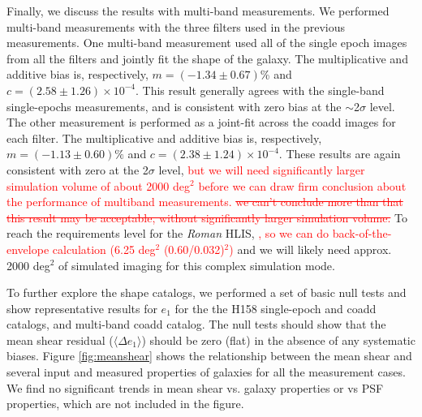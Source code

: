 \documentclass[fleqn,usenatbib]{mnras}
\begin{document}
Finally, we discuss the results with multi-band measurements. We performed multi-band measurements with the three filters used in the previous measurements. One multi-band measurement used all of the single epoch images from all the filters and jointly fit the shape of the galaxy. The multiplicative and additive bias is, respectively, $m=(-1.34\pm0.67)$\% and $c=(2.58\pm1.26)\times10^{-4}$. This result generally agrees with the single-band single-epochs measurements, and is consistent with zero bias at the $\sim$2$\sigma$ level. The other measurement is performed as a joint-fit across the coadd images for each filter. The multiplicative and additive bias is, respectively, $m=(-1.13\pm0.60)\%$ and $c=(2.38\pm1.24)\times10^{-4}$. These results are again consistent with zero at the 2$\sigma$ level, \textcolor{red}{but we will need significantly larger simulation volume of about 2000 \textrm{deg}$^2$ before we can draw firm conclusion about the performance of multiband measurements.} \textcolor{red}{\sout{we can't conclude more than that this result may be acceptable, without significantly larger simulation volume.}} To reach the requirements level for the \emph{Roman} HLIS, \textcolor{red}{, so we can do back-of-the-envelope calculation (6.25 \textrm{deg}$^2$ \times (0.60/0.032)$^2$)} and we will likely need approx. 2000 \textrm{deg}$^{2}$ of simulated imaging for this complex simulation mode. 

To further explore the shape catalogs, we performed a set of basic null tests and show representative results for $e_1$ for the the H158 single-epoch and coadd catalogs, and multi-band coadd catalog. The null tests should show that the mean shear residual ($\langle \Delta e_{1} \rangle$) should be zero (flat) in the absence of any systematic biases. Figure \ref{fig:meanshear} shows the relationship between the mean shear and several input and measured properties of galaxies for all the measurement cases. We find no significant trends in mean shear vs. galaxy properties or vs PSF properties, which are not included in the figure. 
\end{document}
